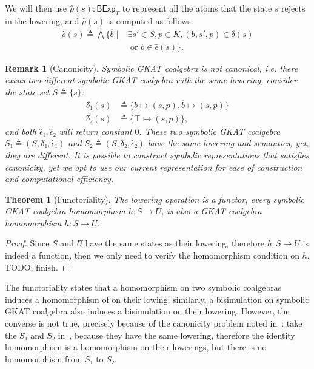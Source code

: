 \documentclass[conference]{IEEEtran}
\newtheorem{theorem}{Theorem}
\newtheorem{remark}[definition]{Remark}
\newcommand{\theoryOf}[1]{\ensuremath{\mathsf{#1}}}
\newcommand{\BExp}{\theoryOf{BExp}}
\begin{document}
We will then use \(ρ̂(s): \BExp_T\) to represent all the atoms that the state \(s\) rejects in the lowering, and \(ρ̂(s)\) is computed as follows:
\begin{align*}
    ρ̂(s) ≜ ⋀ \{\overline{b} ∣{}
        & ∃ s' ∈ S, p ∈ K, (b, s', p) ∈ δ̂(s) \\
        & \text{ or } b ∈ ϵ̂(s)\}.
\end{align*}

\begin{remark}[Canonicity]\label{rem:canonicity}
    Symbolic GKAT coalgebra is not canonical, i.e. there exists two different symbolic GKAT coalgebra with the same lowering, consider the state set \(S ≜ \{s\}\):
    \begin{align*}
        {δ̂}₁(s) & ≜ \{b ↦ (s, p), \overline{b} ↦ (s, p)\} \\
        {δ̂}₂(s) & ≜ \{⊤ ↦ (s, p)\},
    \end{align*} 
    and both \(ϵ̂₁, ϵ̂₂\) will return constant \(0\).
    These two symbolic GKAT coalgebra \(Ŝ₁ ≜ (S, δ̂₁, ϵ̂₁)\) and \(Ŝ₂ ≜ (S, δ̂₂, ϵ̂₂)\) have the same lowering and semantics, yet, they are different.
    It is possible to construct symbolic representations that satisfies canonicity, yet we opt to use our current representation for ease of construction and computational efficiency.
\end{remark}

\begin{theorem}[Functoriality]\label{thm:lowering-functor}
    The lowering operation is a functor, every symbolic GKAT coalgebra homomorphism \(h: Ŝ → Û\), is also a GKAT coalgebra homomorphism \(h: S → U\).
\end{theorem}

\begin{proof}
    Since \(Ŝ\) and \(Û\) have the same states as their lowering, therefore \(h: S → U\) is indeed a function, then we only need to verify the homomorphism condition on \(h\).
    TODO: finish.
\end{proof}

The functoriality states that a homomorphism on two symbolic coalgebras induces a homomorphism of on their lowing; similarly, a bisimulation on symbolic GKAT coalgebra also induces a bisimulation on their lowering.
However, the converse is not true, precisely because of the canonicity problem noted in~: take the \(Ŝ₁\) and \(Ŝ₂\) in~, because they have the same lowering, therefore the identity homomorphism is a homomorphism on their lowerings, but there is no homomorphism from \(Ŝ₁\) to \(Ŝ₂\).
\end{document}
